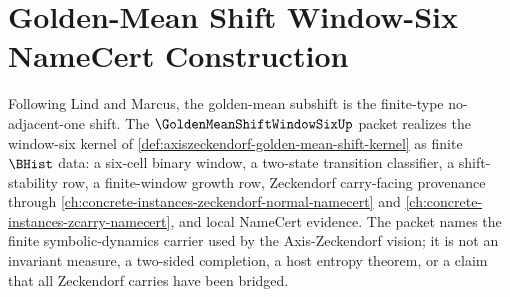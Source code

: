 \chapter{Golden-Mean Shift Window-Six NameCert Construction}
\label{ch:concrete-instances-golden-mean-shift-window-six-namecert}

Following Lind and Marcus, the golden-mean subshift is the finite-type no-adjacent-one shift. The $\GoldenMeanShiftWindowSixUp$ packet realizes the window-six kernel of \autoref{def:axiszeckendorf-golden-mean-shift-kernel} as finite $\BHist$ data: a six-cell binary window, a two-state transition classifier, a shift-stability row, a finite-window growth row, Zeckendorf carry-facing provenance through \autoref{ch:concrete-instances-zeckendorf-normal-namecert} and \autoref{ch:concrete-instances-zcarry-namecert}, and local NameCert evidence. The packet names the finite symbolic-dynamics carrier used by the Axis-Zeckendorf vision; it is not an invariant measure, a two-sided completion, a host entropy theorem, or a claim that all Zeckendorf carries have been bridged.

